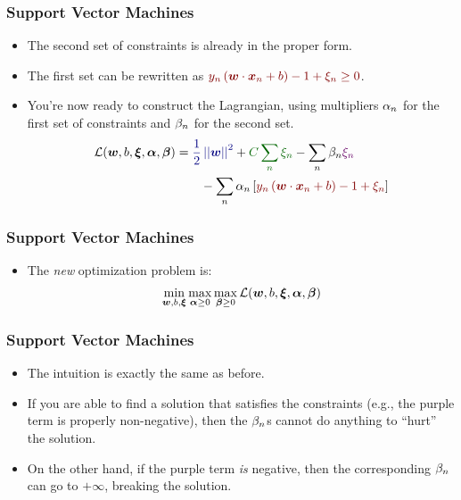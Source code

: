 \documentclass[trans]{beamer}
\begin{document}
\begin{frame}
  \frametitle{Support Vector Machines}
\begin{itemize}
\item 
The second set of constraints is already in the proper form.
\item The first
set can be rewritten as $\textcolor{darkred}{y_n \left(
    \dotp{\vw}{\vx_n} + b \right) - 1 + \xi_n \geq 0}$.  
    \item You're now
ready to construct the Lagrangian, using multipliers $\alpha_n$ for the
first set of constraints and $\beta_n$ for the second set.
%
\begin{align}
\cL(\vw,b,\vec\xi,\vec\al,\vec\be)
&= 
  \textcolor{darkblue}{\frac 1 2 \norm{\vw}^2}
+ \textcolor{darkergreen}{C \sum_n \xi_n}
- \sum_n \be_n \textcolor{darkpurple}{\xi_n}
\\&\qquad
- \sum_n \al_n \left[
    \textcolor{darkred}{y_n \left( \dotp{\vw}{\vx_n} + b \right) - 1 + \xi_n}
  \right] 
\end{align}
%
\end{itemize}
\end{frame}

\begin{frame}
  \frametitle{Support Vector Machines}
\begin{itemize}
\item 
The \emph{new} optimization problem is:
%
\begin{align}
\min_{{\boldsymbol{w}},b,\boldsymbol{\xi}} \max_{\boldsymbol{\alpha} \geq 0} \max_{\boldsymbol{\beta} \geq 0} \mathcal{L}({\boldsymbol{w}},b,\boldsymbol{\xi},\boldsymbol{\alpha},\boldsymbol{\beta})
\end{align}
%
\end{itemize}
\end{frame}

\begin{frame}
  \frametitle{Support Vector Machines}
\begin{itemize}
\item 
The intuition is exactly the same as before. 
\item If you are able to find
a solution that satisfies the constraints (e.g., the purple term is
properly non-negative), then the $\beta_n$s cannot do anything to
``hurt'' the solution. 
\item On the other hand, if the purple term
\emph{is} negative, then the corresponding $\beta_n$ can go to
$+\infty$, breaking the solution.
\end{itemize}
\end{frame}
\end{document}
